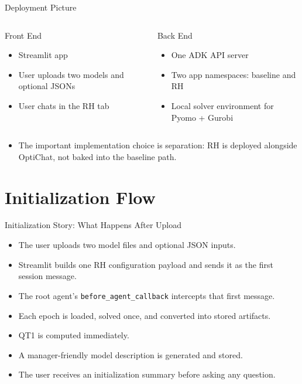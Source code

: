 \documentclass[10pt]{beamer}
\newcommand{\goodbox}[2]{
  \begin{block}{#1}
  #2
  \end{block}
}
\newcommand{\func}[1]{\texttt{#1}}
\begin{document}
\begin{frame}{Deployment Picture}
  \begin{columns}[T]
    \goodbox{Front End}{
      \begin{itemize}
        \item Streamlit app
        \item User uploads two models and optional JSONs
        \item User chats in the RH tab
      \end{itemize}
    }
    \goodbox{Back End}{
      \begin{itemize}
        \item One ADK API server
        \item Two app namespaces: baseline and RH
        \item Local solver environment for Pyomo + Gurobi
      \end{itemize}
    }
  \end{columns}
  \vspace{0.5em}
  \begin{itemize}
    \item The important implementation choice is separation: RH is deployed alongside OptiChat, not baked into the baseline path.
  \end{itemize}
\end{frame}

\section{Initialization Flow}

\begin{frame}{Initialization Story: What Happens After Upload}
  \begin{itemize}
    \item The user uploads two model files and optional JSON inputs.
    \item Streamlit builds one RH configuration payload and sends it as the first session message.
    \item The root agent's \func{before\_agent\_callback} intercepts that first message.
    \item Each epoch is loaded, solved once, and converted into stored artifacts.
    \item QT1 is computed immediately.
    \item A manager-friendly model description is generated and stored.
    \item The user receives an initialization summary before asking any question.
  \end{itemize}
\end{frame}
\end{document}
